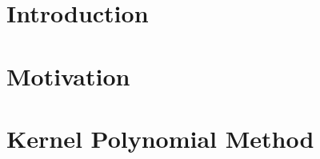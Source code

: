 \documentclass[11pt, a4paper]{report}
\theoremstyle{mydefinition}
\newcommand{\1}{\mathds{1}}
\begin{document}




\tableofcontents

\chapter{Introduction}


\chapter{Motivation}


\chapter{Kernel Polynomial Method}



    
\end{document}

